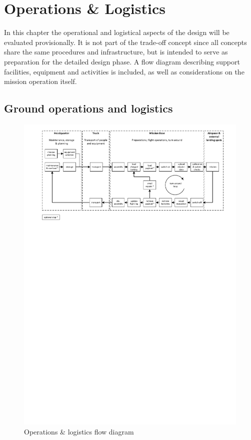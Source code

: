 \chapter{Operations \& Logistics}
\label{sec:ol}
In this chapter the operational and logistical aspects of the design will be evaluated provisionally. It is not part of the trade-off concept since all concepts share the same procedures and infrastructure, but is intended to serve as preparation for the detailed design phase. A flow diagram describing support facilities, equipment and activities is included, as well as considerations on the mission operation itself.  

\section{Ground operations and logistics}

\begin{figure}[htb]
    \centering
    \includegraphics[width=1.05\textwidth]{Operations/Figures/operations_logistics.pdf}
    \caption{Operations \& logistics flow diagram}
    \label{fig:opslogsdig}
\end{figure}

